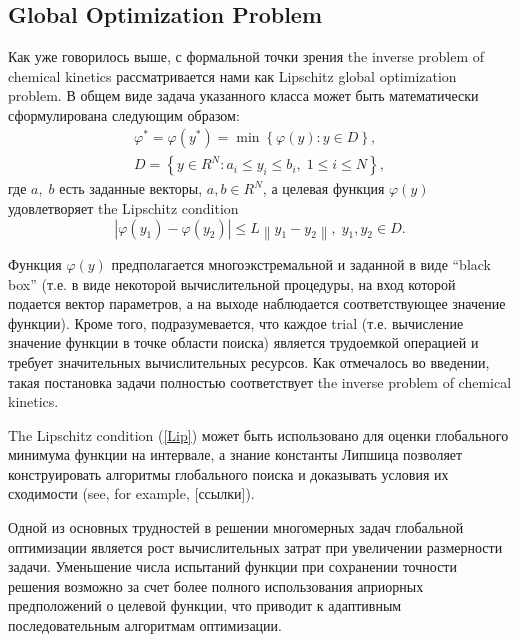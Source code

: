 \documentclass{svproc}
\begin{document}


\section{}\label{Sec_GSA}

\subsection{Global Optimization Problem}

Как уже говорилось выше, с формальной точки зрения the inverse problem of chemical kinetics рассматривается нами как Lipschitz global optimization problem. 
В общем виде задача указанного класса может быть математически сформулирована следующим образом:
\begin{gather}
 \varphi^* = \varphi(y^\ast)=\min{\left\{\varphi(y):y\in D\right\}}, \label{problemN}\\
 D=\left\{y\in R^N: a_i\leq y_i \leq b_i, \;  1\leq i \leq N\right\} \label{D},
\end{gather}
где $a,\; b$ есть заданные векторы, $a,b\in R^N$, а целевая функция $\varphi(y)$ удовлетворяет the Lipschitz condition
\begin{equation}\label{Lip}
\left|\varphi(y_1)-\varphi(y_2)\right|\leq L\left\|y_1-y_2\right\|,\; y_1,y_2 \in D.
\end{equation}

Функция $\varphi(y)$ предполагается многоэкстремальной и заданной в виде ``black box'' (т.е. в виде некоторой вычислительной процедуры, на вход которой подается вектор параметров, а на выходе наблюдается соответствующее значение функции). Кроме того, подразумевается, что каждое trial (т.е. вычисление значение функции в точке области поиска) является трудоемкой операцией и требует значительных вычислительных ресурсов. Как отмечалось во введении, такая постановка задачи полностью соответствует the inverse problem of chemical kinetics.

The Lipschitz condition (\ref{Lip}) может быть использовано для оценки глобального минимума функции на интервале, а знание константы Липшица позволяет конструировать алгоритмы глобального поиска и доказывать условия их сходимости (see, for example, [ссылки]).

Одной из основных трудностей в решении многомерных задач глобальной оптимизации является рост вычислительных затрат при увеличении размерности задачи. Уменьшение числа испытаний функции при сохранении точности решения возможно за счет более полного использования априорных предположений о целевой функции, что приводит к адаптивным последовательным алгоритмам оптимизации.
\end{document}
